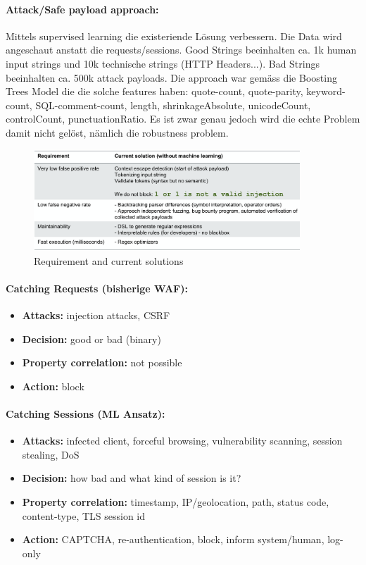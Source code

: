 \documentclass[10pt,a4paper]{article}
\begin{document}
\paragraph*{Attack/Safe payload approach:} Mittels supervised learning die existeriende Lösung verbessern. Die Data wird angeschaut anstatt die requests/sessions. Good Strings beeinhalten ca. 1k human input strings und 10k technische strings (HTTP Headers...). Bad Strings beeinhalten ca. 500k attack payloads. Die approach war gemäss die Boosting Trees Model die die solche features haben: quote-count, quote-parity, keyword-count, SQL-comment-count, length, shrinkageAbsolute, unicodeCount, controlCount, punctuationRatio. Es ist zwar genau jedoch wird die echte Problem damit nicht gelöst, nämlich die robustness problem.
\begin{figure}[H]
    \begin{center}
    \includegraphics[width=10cm]{images/requirementML.png}
    \caption{Requirement and current solutions}
    \label{requirementML}
    \end{center}
\end{figure}

\paragraph*{Catching Requests (bisherige WAF):}
\begin{itemize}[noitemsep,topsep=0pt,leftmargin=*]
	\item \textbf{Attacks:} injection attacks, CSRF
	\item \textbf{Decision:} good or bad (binary)
	\item \textbf{Property correlation:} not possible
	\item \textbf{Action:} block
\end{itemize}
\paragraph*{Catching Sessions (ML Ansatz):}
\begin{itemize}[noitemsep,topsep=0pt,leftmargin=*]
	\item \textbf{Attacks:} infected client, forceful browsing, vulnerability scanning, session stealing, DoS
	\item \textbf{Decision:} how bad and what kind of session is it?
	\item \textbf{Property correlation:} timestamp, IP/geolocation, path, status code, content-type, TLS session id
	\item \textbf{Action:} CAPTCHA, re-authentication, block, inform system/human, log-only
\end{itemize}
\end{document}
